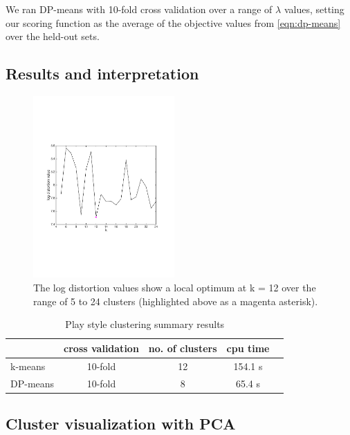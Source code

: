 \documentclass[letterpaper,10 pt,conference]{ieeeconf}
\begin{document}
We ran DP-means with 10-fold cross validation over a range of $\lambda$ values, setting our scoring function as the average of the objective values from \eqref{eqn:dp-means} over the held-out sets.

\subsection{Results and interpretation}



\begin{figure}[htbp!]
  \centering
  \includegraphics[trim=55pt 200pt 70pt 200pt, clip, width=0.48\textwidth]{km-conv.pdf}
  \caption{The log distortion values show a local optimum at k = 12 over the range of 5 to 24 clusters (highlighted above as a magenta asterisk).}
  \label{fig:kmeans-conv}
\end{figure}

\begin{table}[htbp!]
  \centering
  \caption{Play style clustering summary results}
  \begin{tabular}{lcccc}
    \toprule
    & cross validation & no. of clusters & cpu time \\ \midrule
    k-means & 10-fold & 12 & 154.1 s \\
    DP-means & 10-fold & 8 & 65.4 s \\
    \bottomrule
  \end{tabular}
  \label{tab:clus}
\end{table}

\subsection{Cluster visualization with PCA}
\end{document}
